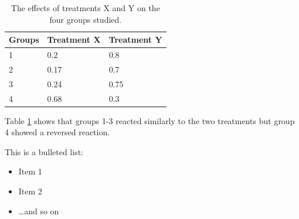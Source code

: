 \documentclass[idxtotoc,hyperref,openany]{labbook} %
\begin{document}



\begin{table}[H]
\begin{tabular}{l l l}
\toprule
\textbf{Groups} & \textbf{Treatment X} & \textbf{Treatment Y} \\
\toprule
1 & 0.2 & 0.8\\
2 & 0.17 & 0.7\\
3 & 0.24 & 0.75\\
4 & 0.68 & 0.3\\
\bottomrule
\end{tabular}
\caption{The effects of treatments X and Y on the four groups studied.}
\label{tab:treatments_xy}
\end{table}

Table \ref{tab:treatments_xy} shows that groups 1-3 reacted similarly to the two treatments but group 4 showed a reversed reaction.




This is a bulleted list:

\begin{itemize}
\item Item 1
\item Item 2
\item \ldots and so on
\end{itemize}



\lipsum[6]



\lipsum[7]


\labday{} %
\end{document}
